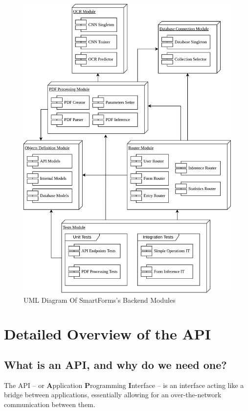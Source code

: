 \documentclass[11pt, a4paper]{report}
\begin{document}
\begin{figure}[!h]
	\centering
	\includegraphics[width=37em]{images/diagrams/ProjectModulesDiagram.png}
	\caption{UML Diagram Of SmartForms's Backend Modules}
	\label{smart-forms-modules}
\end{figure}


\chapter{Detailed Overview of the API}
\label{chapter-detailed-overview-of-the-api}

\section{What is an API, and why do we need one?}

The API -- or \textbf{A}pplication \textbf{P}rogramming \textbf{I}nterface -- is an interface acting like a bridge between applications, essentially allowing for an over-the-network communication between them.
\end{document}
